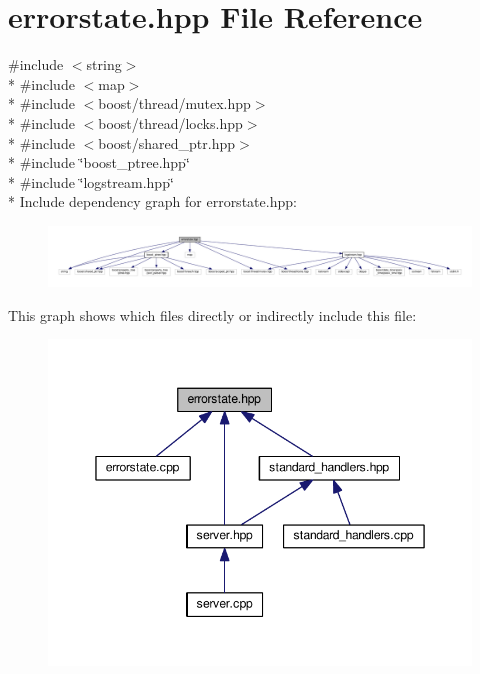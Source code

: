 \hypertarget{a00058}{\section{errorstate.\-hpp File Reference}
\label{a00058}
}
{\ttfamily \#include $<$string$>$}\\*
{\ttfamily \#include $<$map$>$}\\*
{\ttfamily \#include $<$boost/thread/mutex.\-hpp$>$}\\*
{\ttfamily \#include $<$boost/thread/locks.\-hpp$>$}\\*
{\ttfamily \#include $<$boost/shared\-\_\-ptr.\-hpp$>$}\\*
{\ttfamily \#include \char`\"{}boost\-\_\-ptree.\-hpp\char`\"{}}\\*
{\ttfamily \#include \char`\"{}logstream.\-hpp\char`\"{}}\\*
Include dependency graph for errorstate.\-hpp\-:\nopagebreak
\begin{figure}[H]
\begin{center}
\leavevmode
\includegraphics[width=350pt]{a00105}
\end{center}
\end{figure}
This graph shows which files directly or indirectly include this file\-:\nopagebreak
\begin{figure}[H]
\begin{center}
\leavevmode
\includegraphics[width=348pt]{a00106}
\end{center}
\end{figure}

